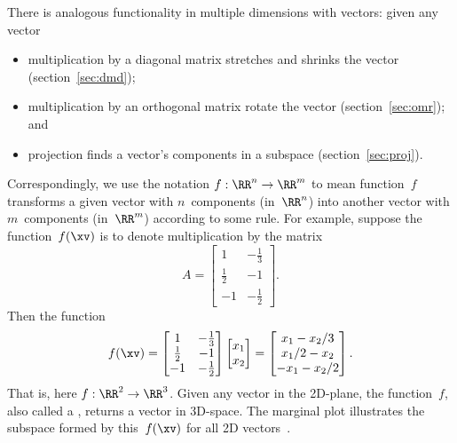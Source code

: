There is analogous functionality in multiple dimensions with vectors: given any vector 
\begin{itemize}
\item multiplication by a diagonal matrix stretches and shrinks the vector (section~\ref{sec:dmd});
\item multiplication by an orthogonal matrix rotate the vector (section~\ref{sec:omr});
and \item projection finds a vector's components in a subspace (section~\ref{sec:proj}).
\end{itemize}
Correspondingly, we use the notation \(f:\RR^n\to\RR^m\) to mean function~\(f\) transforms a given vector with \(n\)~components (in~\(\RR^n\)) into another vector with \(m\)~components (in~\(\RR^m\)) according to some rule. 
For example, suppose the function~\(f(\xv)\) is to denote multiplication by the matrix
\begin{equation*}
A=\begin{bmatrix} 1&-\frac13\\\frac12&-1\\-1&-\frac12 \end{bmatrix}.
\end{equation*}
Then the function
\begin{equation*}
f(\xv)=\begin{bmatrix} 1&-\frac13\\\frac12&-1\\-1&-\frac12 \end{bmatrix}\begin{bmatrix} x_1\\x_2 \end{bmatrix}
=\begin{bmatrix} x_1-x_2/3\\x_1/2-x_2\\-x_1-x_2/2 \end{bmatrix}.
\end{equation*}
%
That is, here \(f:\RR^2\to\RR^3\).  
Given any vector in the 2D-plane, the function~\(f\), also called a , returns a vector in 3D-space.  
The marginal plot illustrates the subspace formed by this~\(f(\xv)\) for all 2D vectors~\xv.



